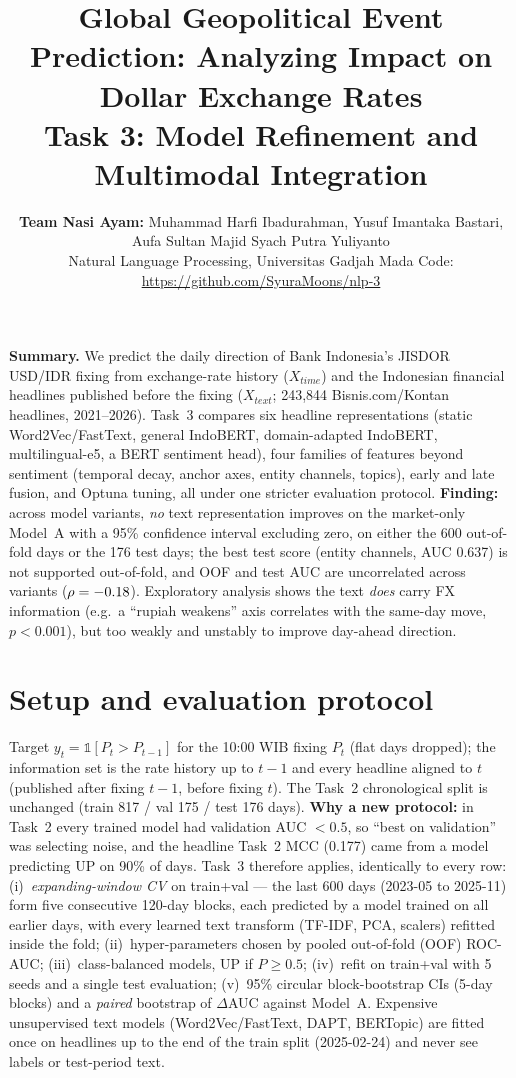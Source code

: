\documentclass[10pt,a4paper]{article}
\title{\vspace{-1.3cm}\textbf{\large Global Geopolitical Event Prediction: Analyzing Impact on Dollar Exchange Rates}\\[0.2em]
\large\textbf{Task 3: Model Refinement and Multimodal Integration}}
\author{\small\textbf{Team Nasi Ayam:} Muhammad Harfi Ibadurahman, Yusuf Imantaka Bastari, Aufa Sultan Majid Syach Putra Yuliyanto\\
{\small Natural Language Processing, Universitas Gadjah Mada \quad Code: \url{https://github.com/SyuraMoons/nlp-3}}}
\date{\vspace{-1.6em}}
\begin{document}
\maketitle
\thispagestyle{fancy}

\vspace{-0.6em}
\noindent\textbf{Summary.} We predict the daily direction of Bank Indonesia's JISDOR USD/IDR fixing from exchange-rate history ($X_{time}$) and the Indonesian financial headlines published before the fixing ($X_{text}$; 243,844 Bisnis.com/Kontan headlines, 2021--2026). Task~3 compares six headline representations (static Word2Vec/FastText, general IndoBERT, domain-adapted IndoBERT, multilingual-e5, a BERT sentiment head), four families of features beyond sentiment (temporal decay, anchor axes, entity channels, topics), early and late fusion, and Optuna tuning, all under one stricter evaluation protocol. \textbf{Finding:} across \NRows{} model variants, \emph{no} text representation improves on the market-only Model~A with a 95\% confidence interval excluding zero, on either the 600 out-of-fold days or the 176 test days; the best test score (entity channels, AUC 0.637) is not supported out-of-fold, and OOF and test AUC are uncorrelated across variants ($\rho=-0.18$). Exploratory analysis shows the text \emph{does} carry FX information (e.g.\ a ``rupiah weakens'' axis correlates with the same-day move, $p<0.001$), but too weakly and unstably to improve day-ahead direction.

\section{Setup and evaluation protocol}
Target $y_t=\mathbb{1}[P_t>P_{t-1}]$ for the 10:00 WIB fixing $P_t$ (flat days dropped); the information set is the rate history up to $t-1$ and every headline aligned to $t$ (published after fixing $t-1$, before fixing $t$). The Task~2 chronological split is unchanged (train 817 / val 175 / test 176 days). \textbf{Why a new protocol:} in Task~2 every trained model had validation AUC $<0.5$, so ``best on validation'' was selecting noise, and the headline Task~2 MCC (0.177) came from a model predicting UP on 90\% of days. Task~3 therefore applies, identically to every row: (i)~\emph{expanding-window CV} on train+val --- the last 600 days (2023-05 to 2025-11) form five consecutive 120-day blocks, each predicted by a model trained on all earlier days, with every learned text transform (TF-IDF, PCA, scalers) refitted inside the fold; (ii)~hyper-parameters chosen by pooled out-of-fold (OOF) ROC-AUC; (iii)~class-balanced models, UP if $P\ge0.5$; (iv)~refit on train+val with 5 seeds and a single test evaluation; (v)~95\% circular block-bootstrap CIs (5-day blocks) and a \emph{paired} bootstrap of $\Delta$AUC against Model~A. Expensive unsupervised text models (Word2Vec/FastText, DAPT, BERTopic) are fitted once on headlines up to the end of the train split (2025-02-24) and never see labels or test-period text.
\end{document}
